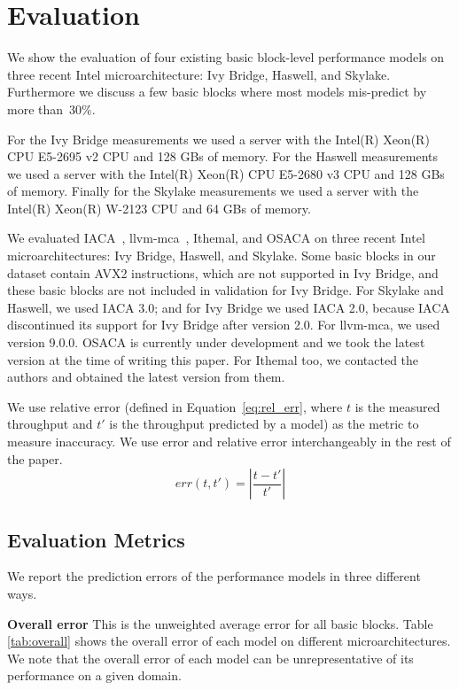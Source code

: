 \section{Evaluation}
We show the evaluation of four existing basic block-level
performance models on three recent Intel microarchitecture:
Ivy Bridge, Haswell, and Skylake. Furthermore we discuss a few basic blocks where most models
mis-predict by more than~30\%.

For the Ivy Bridge measurements we used a server with the Intel(R) Xeon(R) CPU E5-2695 v2 CPU and 128 GBs of memory. 
For the Haswell measurements we used a server with the Intel(R) Xeon(R) CPU E5-2680 v3 CPU and 128 GBs of memory. 
Finally for the Skylake measurements we used a server with the Intel(R) Xeon(R) W-2123 CPU and 64 GBs of memory. 

We evaluated IACA~\cite{iaca}, llvm-mca~\cite{llvm-mca}, Ithemal\cite{ithemal}, and OSACA\cite{osaca}
on three recent Intel microarchitectures: Ivy Bridge, Haswell, and Skylake.
Some basic blocks in our dataset contain AVX2 instructions, which are not supported in Ivy Bridge,
and these basic blocks are not included in validation for Ivy Bridge.
For Skylake and Haswell, we used IACA 3.0;
and for Ivy Bridge we used IACA 2.0, because IACA discontinued its support for
Ivy Bridge after version 2.0.
For llvm-mca, we used version 9.0.0. OSACA is currently under development and we took the latest version at the time of writing this paper. For Ithemal too, we contacted the authors and obtained the latest version from them.

We use relative error (defined in Equation~\ref{eq:rel_err}, where $t$ is the measured throughput and $t'$ is the throughput predicted by a model)
as the metric to measure inaccuracy.
We use error and relative error interchangeably in the rest of the paper.
\begin{equation}
\mathit{err}(t, t') = \left| \frac{t - t'}{t'} \right| 
\label{eq:rel_err}
\end{equation}

\subsection{Evaluation Metrics}\label{results}
We report the prediction errors of the performance models in three different ways.

\textbf{Overall error} This is the unweighted average error for all basic blocks.
Table \ref{tab:overall} shows the overall error of each model on different microarchitectures.
We note that the overall error of each model can be unrepresentative
of its performance on a given domain.

